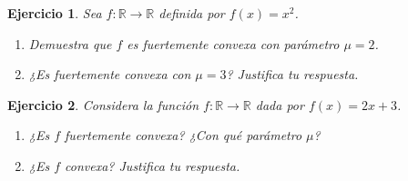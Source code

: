 \documentclass[11pt]{report}
\newtheorem{ex}{Ejercicio}
\begin{document}
\begin{ex}
  Sea \( f: \mathbb{R} \to \mathbb{R} \) definida por \( f(x) = x^2 \).
  \begin{enumerate}
    \item Demuestra que \( f \) es fuertemente convexa con parámetro \( \mu = 2 \).
    \item ¿Es fuertemente convexa con \( \mu = 3 \)? Justifica tu respuesta.
  \end{enumerate}

\end{ex}

\begin{ex}
  Considera la función \( f: \mathbb{R} \to \mathbb{R} \) dada por \( f(x) = 2x + 3 \).
  \begin{enumerate}
    \item ¿Es \( f \) fuertemente convexa? ¿Con qué parámetro \( \mu \)?
    \item ¿Es \( f \) convexa? Justifica tu respuesta.
  \end{enumerate}

\end{ex}
\end{document}
